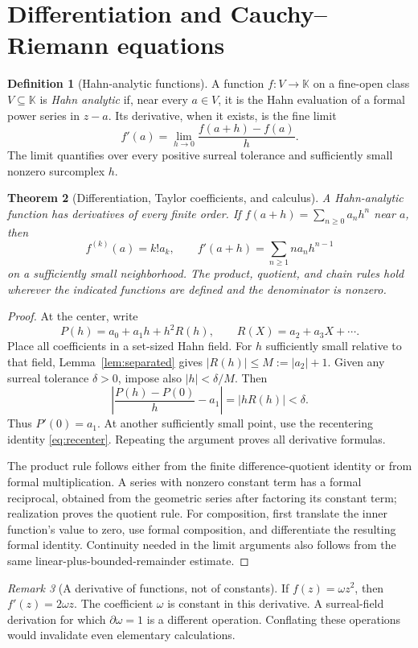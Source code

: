 \documentclass[11pt,a4paper]{article}
\newtheorem{theorem}{Theorem}[section]
\theoremstyle{definition}\newtheorem{definition}[theorem]{Definition}
\theoremstyle{remark}\newtheorem{remark}[theorem]{Remark}
\newcommand{\K}{\mathbb K}
\numberwithin{equation}{section}
\begin{document}
\section{Differentiation and Cauchy--Riemann equations}\label{sec:derivatives}

\begin{definition}[Hahn-analytic functions]
A function $f:V\to\K$ on a fine-open class $V\subseteq\K$ is \emph{Hahn analytic} if, near every $a\in V$, it is the Hahn evaluation of a formal power series in $z-a$. Its derivative, when it exists, is the fine limit
\[
 f'(a)=\lim_{h\to0}\frac{f(a+h)-f(a)}h.
\]
The limit quantifies over every positive surreal tolerance and sufficiently small nonzero surcomplex $h$.
\end{definition}

\begin{theorem}[Differentiation, Taylor coefficients, and calculus]\label{thm:derivative}
A Hahn-analytic function has derivatives of every finite order. If
$f(a+h)=\sum_{n\geq0}a_nh^n$ near $a$, then
\[
 f^{(k)}(a)=k!a_k,
 \qquad
 f'(a+h)=\sum_{n\geq1}na_nh^{n-1}
\]
on a sufficiently small neighborhood. The product, quotient, and chain rules hold wherever the indicated functions are defined and the denominator is nonzero.
\end{theorem}
\begin{proof}
At the center, write
\[
 P(h)=a_0+a_1h+h^2R(h),\qquad R(X)=a_2+a_3X+\cdots.
\]
Place all coefficients in a set-sized Hahn field. For $h$ sufficiently small relative to that field, Lemma~\ref{lem:separated} gives $|R(h)|\leq M:=|a_2|+1$. Given any surreal tolerance $\delta>0$, impose also $|h|<\delta/M$. Then
\[
 \left|\frac{P(h)-P(0)}h-a_1\right|
 =|hR(h)|<\delta.
\]
Thus $P'(0)=a_1$. At another sufficiently small point, use the recentering identity \eqref{eq:recenter}. Repeating the argument proves all derivative formulas.

The product rule follows either from the finite difference-quotient identity or from formal multiplication. A series with nonzero constant term has a formal reciprocal, obtained from the geometric series after factoring its constant term; realization proves the quotient rule. For composition, first translate the inner function's value to zero, use formal composition, and differentiate the resulting formal identity. Continuity needed in the limit arguments also follows from the same linear-plus-bounded-remainder estimate.
\end{proof}

\begin{remark}[A derivative of functions, not of constants]
If $f(z)=\omega z^2$, then $f'(z)=2\omega z$. The coefficient $\omega$ is constant in this derivative. A surreal-field derivation for which $\partial\omega=1$ is a different operation. Conflating these operations would invalidate even elementary calculations.
\end{remark}
\end{document}
